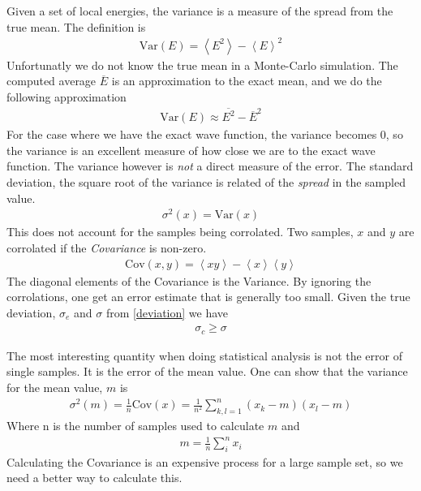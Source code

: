 \documentclass[a4paper, 12pt, titlepage]{article}
\begin{document}
 Given a set of local energies, the variance is a measure of the spread from the true mean. The definition is
 \begin{align*}
 	\text{Var}(E) = \left< E^2 \right> - \left< E \right> ^2 
 \end{align*}
 Unfortunatly we do not know the true mean in a Monte-Carlo simulation. The computed average $\overline E$ is an approximation to the exact mean, and we do the following approximation
 \begin{align*}
 	\text{Var}(E) \approx \overline{E^2} - \overline{E}^2 
 \end{align*}
 For the case where we have the exact wave function, the variance becomes $0$, so the variance is an excellent measure of how close we are to the exact wave function. The variance however is \textit{not} a direct measure of the error. The standard deviation, the square root of the variance is related of the \textit{spread} in the sampled value. 
 \begin{align}
 	\sigma ^2(x) = \text{Var}(x)
 	\label{deviation}
 \end{align}
 This does not account for the samples being corrolated. Two samples, $x$ and $y$ are corrolated if the \textit{Covariance} is non-zero.
 \begin{align*}
 	\text{Cov}(x,y) = \left< xy \right> - \left< x \right> \left<y \right> 
 \end{align*}
 The diagonal elements of the Covariance is the Variance. By ignoring the corrolations, one get an error estimate that is generally too small. Given the true deviation, $\sigma_e$ and $\sigma$ from \ref{deviation} we have
 \begin{align*}
 	\sigma_c \geq \sigma
 \end{align*}

 The most interesting quantity when doing statistical analysis is not the error of single samples. It is the error of the mean value. One can show that the variance for the mean value, $m$ is 
 \begin{align*}
 	\sigma^2 (m) = \frac{1}{n} \text{Cov}(x) = \frac{1}{n^2} \sum_{k,l=1}^n (x_k - m)(x_l - m )
 \end{align*}
 Where n is the number of samples used to calculate $m$ and 
 \begin{align*}
 	m = \frac{1}{n} \sum_i^n x_i
 \end{align*}
 Calculating the Covariance is an expensive process for a large sample set, so we need a better way to calculate this. 
\end{document}
